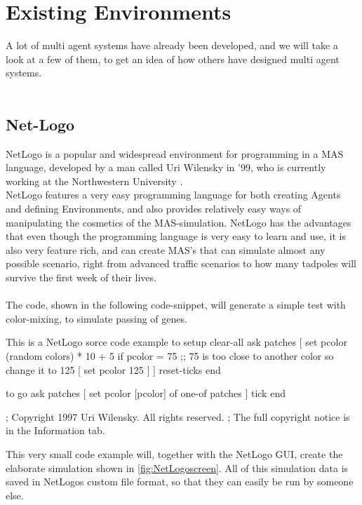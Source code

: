 \chapter{Existing Environments}

A lot of multi agent systems have already been developed, and we will take a look at a few of them, to get an idea of how others have designed multi agent systems.\\
\\
\section{Net-Logo}
NetLogo is a popular and widespread environment for programming in a MAS language, developed by a man called Uri Wilensky in '99, who is currently working at the Northwestern University \cite{misc:northwestern}.\\ \indent NetLogo features a very easy programming language for both creating Agents and defining Environments, and also provides relatively easy ways of manipulating the cosmetics of the MAS-simulation. NetLogo has the advantages that even though the programming language is very easy to learn and use, it is also very feature rich, and can create MAS's that can simulate almost any possible scenario, right from advanced traffic scenarios to how many tadpoles will survive the first week of their lives. \\
\\
The code, shown in the following code-snippet, will generate a simple test with color-mixing, to simulate passing of genes.

\begin{NetLogo}{This is a NetLogo sorce code example}{}
to setup
  clear-all
  ask patches
    [ set pcolor (random colors) * 10 + 5
        if pcolor = 75  ;; 75 is too close to another color so change it to 125
          [ set pcolor 125 ] ]
  reset-ticks
end

to go
  ask patches [ set pcolor [pcolor] of one-of patches ]
  tick
end


; Copyright 1997 Uri Wilensky. All rights reserved.
; The full copyright notice is in the Information tab.
\end{NetLogo}

This very small code example will, together with the NetLogo GUI, create the elaborate simulation shown in \ref{fig:NetLogoscreen}. All of this simulation data is saved in NetLogos custom file format, so that they can easily be run by someone else.

